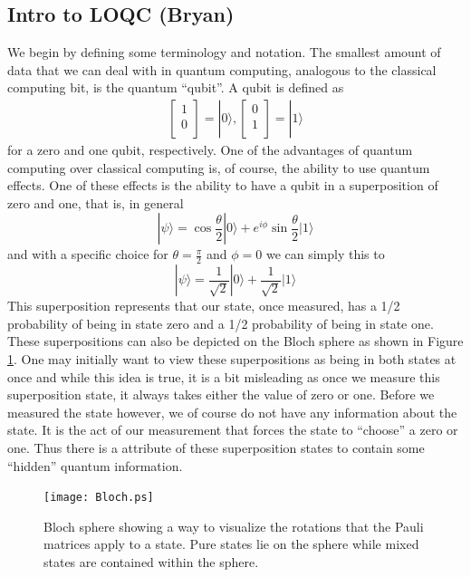 \documentclass[aps,pra,twocolumn,amsmath,amssymb,nofootinbib,superscriptaddress]{revtex4}
\newcommand{\ket}[1]{|#1\rangle}
\begin{document}
\subsection{Intro to LOQC (Bryan)}
  We begin by defining some terminology and notation. The smallest amount of data that we can deal with in quantum computing, analogous to the classical computing bit, is the quantum ``qubit''. A qubit is defined as 
\begin{eqnarray}
 \left[ \begin{array}{l}
1 \\
0 \\
\end{array} \right] = \ket{0},
\left[ \begin{array}{l}
0 \\
1 \\
\end{array} \right] = \ket{1}
\end{eqnarray}
for a zero and one qubit, respectively. One of the advantages of quantum computing over classical computing is, of course, the ability to use quantum effects. One of these effects is the ability to have a qubit in a superposition of zero and one, that is, in general
\begin{equation}
\ket{\psi} = \cos{\frac{\theta}{2}} \ket{0} + e^{i \phi} \sin{\frac{\theta}{2}}\ket{1}
\end{equation}
 and with a specific choice for $\theta =\frac{\pi}{2}$ and $\phi =0$ we can simply this to
\begin{equation}
\ket{\psi}= \frac{1}{\sqrt{2}} \ket{0} + \frac{1}{\sqrt{2}} \ket{1}
\end{equation}
This superposition represents that our state, once measured, has a 1/2 probability of being in state zero and a 1/2 probability of being in state one. These superpositions can also be depicted on the Bloch sphere as shown in Figure \ref{fig:Bloch}. One may initially want to view these superpositions as being in both states at once and while this idea is true, it is a bit misleading as once we measure this superposition state, it always takes either the value of zero or one. Before we measured the state however, we of course do not have any information about the state. It is the act of our measurement that forces the state to ``choose'' a zero or one. Thus there is a attribute of these superposition states to contain some ``hidden'' quantum information.
\begin{figure}[bt]
 \centering
  \texttt{[image: Bloch.ps]}
  \caption{ Bloch sphere showing a way to visualize the rotations that the Pauli matrices apply to a state. Pure states lie on the sphere while mixed states are contained within the sphere.}
  \label{fig:Bloch}
\end{figure}
\end{document}
